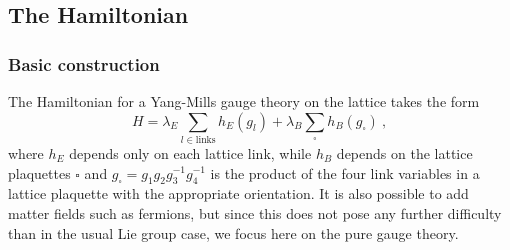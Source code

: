 \subsection{The Hamiltonian}

\subsubsection{Basic construction}\label{eq:hamiltonian basic construction}

The Hamiltonian for a Yang-Mills gauge theory on the lattice takes the form \cite{KogSuss, ZoharBurrello}
\begin{equation}
    \label{eq:generic hamiltonian}
    H = \lambda_E \sum_{l \in \mathrm{links}} h_E(g_l) + \lambda_B \sum_{\square} h_B(g_\square) \ ,
\end{equation}
where $h_E$ depends only on each lattice link, while $h_B$ depends on the lattice plaquettes $\square$ and $g_\square = g_1 g_2 g_3^{-1} g_4^{-1}$ is the product of the four link variables in a lattice plaquette with the appropriate orientation.
It is also possible to add matter fields such as fermions, but since this does not pose any further difficulty than in the usual Lie group case, we focus here on the pure gauge theory.

